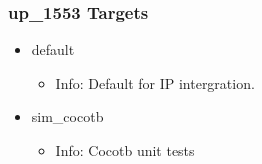 \subsubsection{up\_1553 Targets}
\begin{itemize}
\item default
	\begin{itemize}
	\item[$\space$] Info: Default for IP intergration.
	\end{itemize}
\item sim\_cocotb
	\begin{itemize}
	\item[$\space$] Info: Cocotb unit tests
	\end{itemize}
\end{itemize}

